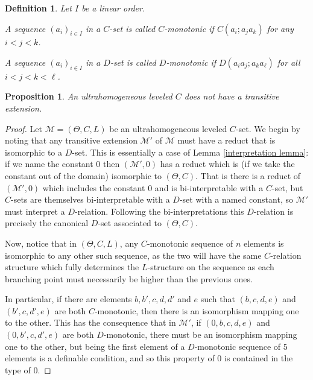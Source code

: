 \documentclass{amsart}
\newtheorem{definition}[theorem]{Definition}
\newtheorem{proposition}[theorem]{Proposition}
\newcommand{\model}{\mathcal{M}}
\begin{document}
\begin{definition}
    Let $I$ be a linear order.
    
    A sequence $(a_i)_{i \in I}$ in a $C$-set is called $C$-monotonic if $C(a_i; a_ja_k)$ for any $i < j < k$. 
    
    A sequence $(a_i)_{i \in I}$ in a $D$-set is called $D$-monotonic if $D(a_ia_j;a_ka_\ell)$ for all $i < j < k < \ell$.
\end{definition}

\begin{proposition}
    An ultrahomogeneous leveled $C$ does not have a transitive extension.
\end{proposition}
\begin{proof}
    Let $\model = (\Theta, C, L)$ be an ultrahomogeneous leveled $C$-set. We begin by noting that any transitive extension $\model'$ of $\model$ must have a reduct that is isomorphic to a $D$-set. This is essentially a case of Lemma \ref{interpretation lemma}: if we name the constant $0$ then $(\model', 0)$ has a reduct which is (if we take the constant out of the domain) isomorphic to $(\Theta, C)$. That is there is a reduct of $(\model',0)$ which includes the constant $0$ and is bi-interpretable with a $C$-set, but $C$-sets are themselves bi-interpretable with a $D$-set with a named constant, so $\model'$ must interpret a $D$-relation. Following the bi-interpretations this $D$-relation is precisely the canonical $D$-set associated to $(\Theta, C)$. 

    Now, notice that in $(\Theta, C, L)$, any $C$-monotonic sequence of $n$ elements is isomorphic to any other such sequence, as the two will have the same $C$-relation structure which fully determines the $L$-structure on the sequence as each branching point must necessarily be higher than the previous ones.

    In particular, if there are elements $b,b',c,d,d'$ and $e$ such that $(b, c, d, e)$ and $(b', c, d',e)$ are both $C$-monotonic, then there is an isomorphism mapping one to the other. This has the consequence that in $\model'$, if $(0, b, c, d, e)$ and $(0, b', c, d', e)$ are both $D$-monotonic, there must be an isomorphism mapping one to the other, but being the first element of a $D$-monotonic sequence of 5 elements is a definable condition, and so this property of $0$ is contained in the type of $0$.


\end{proof}
\end{document}
